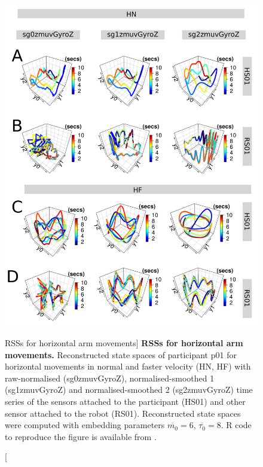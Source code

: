 \begin{figure}
\centering
\includegraphics[height=0.85\textheight]{fig_6_04}
\caption
	[RSSs for horizontal arm movements]{
	{\bf RSSs for horizontal arm movements.}
	Reconstructed state spaces %
	of participant p01 for horizontal movements in normal and faster 
	velocity (HN, HF) with raw-normalised (sg0zmuvGyroZ), 
	normalised-smoothed 1 (sg1zmuvGyroZ) and 
	normalised-smoothed 2 (sg2zmuvGyroZ) time series of the 
	sensors attached to the participant (HS01) and other sensor 
	attached to the robot (RS01).	
	Reconstructed state spaces were computed with 
	embedding parameters $\overline{m_0}=6$, $\overline{\tau_0}=8$.
	R code to reproduce the figure is available from \cite{xochicale2018}.
        }
    \label{fig:rss_aHw10}
\end{figure}

